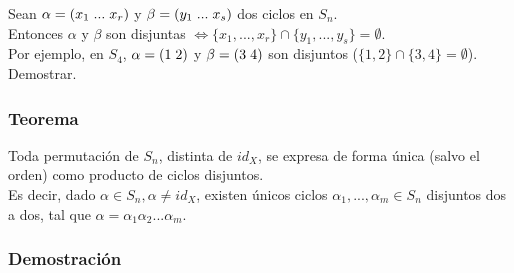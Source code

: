 \documentclass[11pt,a4paper]{article}
\begin{document}
Sean $\alpha = (x_{1} \hspace{0.1cm} ... \hspace{0.1cm} x_{r})$ y $\beta = (y_{1} \hspace{0.1cm} ... \hspace{0.1cm} x_{s})$ dos ciclos en $S_{n}$. \\
Entonces $\alpha$ y $\beta$ son disjuntas $\iff \{x_{1}, ...,  x_{r}\} \cap \{y_{1}, ..., y_{s}\} = \emptyset$. \\
Por ejemplo, en $S_{4}$, $\alpha = (1 \hspace{0.1cm} 2)$ y $\beta = (3 \hspace{0.1cm} 4)$ son disjuntos ($\{1,2\} \cap \{3,4\} = \emptyset$). \\
Demostrar.

\subsubsection*{Teorema}

Toda permutación de $S_{n}$, distinta de $id_{X}$, se expresa de forma única (salvo el orden) como producto de ciclos disjuntos. \\
Es decir, dado $\alpha \in S_{n}, \alpha \neq id_{X}$, existen únicos ciclos $\alpha_{1}, ..., \alpha_{m} \in S_{n}$ disjuntos dos a dos, tal que $\alpha = \alpha_{1} \alpha_{2} ... \alpha_{m}$.

\subsubsection*{Demostración}
\end{document}
